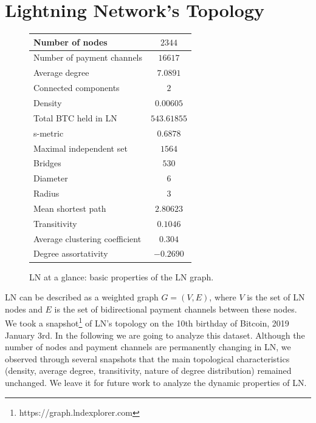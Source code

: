 \documentclass[runningheads]{llncs}
\def\bitcoinA{%
	\leavevmode
	\vtop{\offinterlineskip %
		\setbox0=\hbox{B}%
		\setbox2=\hbox to\wd0{\hfil\hskip-.03em
			\vrule height .3ex width .15ex\hskip .08em
			\vrule height .3ex width .15ex\hfil}
		\vbox{\copy2\box0}\box2}}
\begin{document}
\section{Lightning Network's Topology}
\begin{figure}
	\begin{tabular}{ | l | c | }
		\hline
		Number of nodes & $2344$  \\ \hline
		Number of payment channels & $16617$  \\ \hline
		Average degree & $7.0891$ \\ \hline
		Connected components & $2$  \\ \hline
		Density & $0.00605$ \\ \hline
		Total BTC held in LN & $543.61855$\bitcoinA\\ \hline
		s-metric& $0.6878$ \\ \hline
		Maximal independent set & $1564$ \\ \hline
		Bridges & $530$ \\ \hline
		Diameter & $6$ \\ \hline
		Radius & $3$ \\ \hline
		Mean shortest path &  $2.80623$ \\ \hline
		Transitivity& $0.1046$\\ \hline
		Average clustering coefficient&$0.304$ \\ \hline
		Degree assortativity& $-0.2690$ \\ \hline
	\end{tabular}
	\caption{LN at a glance: basic properties of the LN graph.}\label{fig:properties}
\end{figure}

LN can be described as a weighted graph $G=(V,E)$, where $V$ is the set of LN nodes and $E$ is the set of bidirectional payment channels between these nodes. We took a snapshot\footnote{https://graph.lndexplorer.com} of LN's topology on the 10th birthday of Bitcoin, 2019 January 3rd. In the following we are going to analyze this dataset. Although the number of nodes and payment channels are permanently changing in LN, we observed through several snapshots that the main topological characteristics (density, average degree, transitivity, nature of degree distribution) remained unchanged. We leave it for future work to analyze the dynamic properties of LN.
\end{document}
